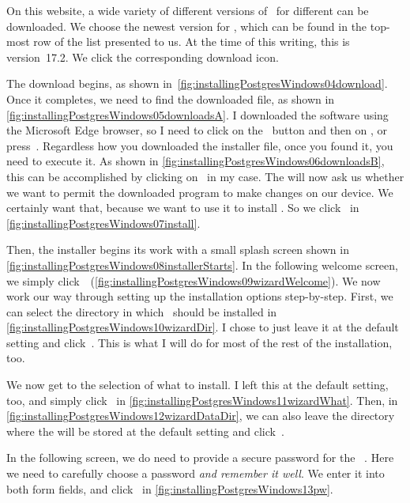 On this website, a wide variety of different versions of \postgresql\ for different  can be downloaded.
We choose the newest version for \microsoftWindows, which can be found in the top-most row of the list presented to us.
At the time of this writing, this is version~17.2.
We click the corresponding download icon.

The download begins, as shown in~\cref{fig:installingPostgresWindows04download}.
Once it completes, we need to find the downloaded file, as shown in \cref{fig:installingPostgresWindows05downloadsA}.
I downloaded the software using the Microsoft Edge browser, so I need to click on the \keys{\dots}~button and then on , or press~.
Regardless how you downloaded the installer file, once you found it, you need to execute it.
As shown in \cref{fig:installingPostgresWindows06downloadsB}, this can be accomplished by clicking on~ in my case.
The  will now ask us whether we want to permit the downloaded program to make changes on our device.
We certainly want that, because we want to use it to install \postgresql.
So we click~ in \cref{fig:installingPostgresWindows07install}.

Then, the installer begins its work with a small splash screen shown in \cref{fig:installingPostgresWindows08installerStarts}.
In the following welcome screen, we simply click~~(\cref{fig:installingPostgresWindows09wizardWelcome}).
We now work our way through setting up the installation options step-by-step.
First, we can select the directory in which \postgresql\ should be installed in \cref{fig:installingPostgresWindows10wizardDir}.
I chose to just leave it at the default setting and click~.
This is what I will do for most of the rest of the installation, too.

We now get to the selection of what to install.
I left this at the default setting, too, and simply click~ in \cref{fig:installingPostgresWindows11wizardWhat}.
Then, in \cref{fig:installingPostgresWindows12wizardDataDir}, we can also leave the directory where the  will be stored at the default setting and click~.

In the following screen, we do need to provide a secure password for the \postgresql\ .
Here we need to carefully choose a password \emph{and remember it well}.
We enter it into both form fields, and click~ in \cref{fig:installingPostgresWindows13pw}.

